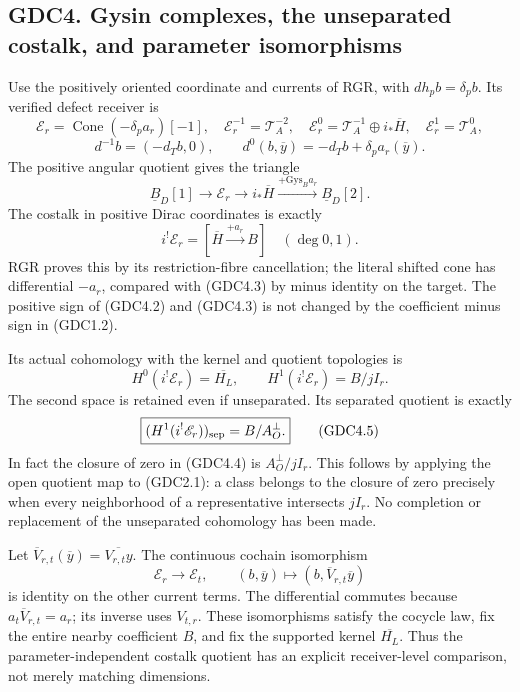 \subsection{GDC4. Gysin complexes, the unseparated costalk, and
parameter
isomorphisms}\label{gdc4.-gysin-complexes-the-unseparated-costalk-and-parameter-isomorphisms}

Use the positively oriented coordinate and currents of RGR, with
\(dh_p b=\delta_pb\). Its verified defect receiver is \[
\mathscr E_r=\operatorname{Cone}(-\delta_pa_r)[-1],
\quad
\mathscr E_r^{-1}=\mathscr T_A^{-2},\quad
\mathscr E_r^0=\mathscr T_A^{-1}\oplus i_*\overline H,\quad
\mathscr E_r^1=\mathscr T_A^0,
\] \[
d^{-1}b=(-d_Tb,0),\qquad d^0(b,\overline y)=-d_Tb+\delta_pa_r(\overline y).
\tag{GDC4.1}
\] The positive angular quotient gives the triangle \[
\underline B_D[1]\to\mathscr E_r\to i_*\overline H
\xrightarrow{+\mathrm{Gys}_B a_r}\underline B_D[2].
\tag{GDC4.2}
\] The costalk in positive Dirac coordinates is exactly \[
i^!\mathscr E_r=[\overline H\xrightarrow{+a_r}B]\quad(\deg0,1).
\tag{GDC4.3}
\] RGR proves this by its restriction-fibre cancellation; the literal
shifted cone has differential \(-a_r\), compared with (GDC4.3) by minus
identity on the target. The positive sign of (GDC4.2) and (GDC4.3) is
not changed by the coefficient minus sign in (GDC1.2).

Its actual cohomology with the kernel and quotient topologies is \[
H^0(i^!\mathscr E_r)=\overline{H_L},\qquad
H^1(i^!\mathscr E_r)=B/jI_r.
\tag{GDC4.4}
\] The second space is retained even if unseparated. Its separated
quotient is exactly \[
\boxed{(H^1(i^!\mathscr E_r))_{\rm sep}=B/A_O^\perp.}
\tag{GDC4.5}
\] In fact the closure of zero in (GDC4.4) is \(A_O^\perp/jI_r\). This
follows by applying the open quotient map to (GDC2.1): a class belongs
to the closure of zero precisely when every neighborhood of a
representative intersects \(jI_r\). No completion or replacement of the
unseparated cohomology has been made.

Let \(\overline V_{r,t}(\overline y)=\overline{V_{r,t}y}\). The
continuous cochain isomorphism \[
\mathscr E_r\longrightarrow\mathscr E_t,
\qquad (b,\overline y)\longmapsto(b,\overline V_{r,t}\overline y)
\tag{GDC4.6}
\] is identity on the other current terms. The differential commutes
because \(a_t\overline V_{r,t}=a_r\); its inverse uses \(V_{t,r}\).
These isomorphisms satisfy the cocycle law, fix the entire nearby
coefficient \(B\), and fix the supported kernel \(\overline{H_L}\). Thus
the parameter-independent costalk quotient has an explicit
receiver-level comparison, not merely matching dimensions.

